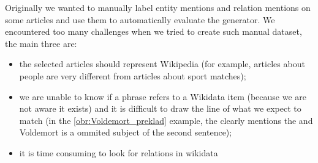 Originally we wanted to manually label entity mentions and relation mentions on some articles and use them to automatically evaluate the generator. We encountered too many challenges when we tried to create such manual dataset, the main three are:
\begin{itemize}
\item the selected articles should represent Wikipedia (for example, articles about people are very different from articles about sport matches);
\item we are unable to know if a phrase refers to a Wikidata item (because we are not aware it exists) and it is difficult to draw the line of what we expect to match (in the \autoref{obr:Voldemort_preklad} example, the  clearly mentions the  and Voldemort is a ommited subject of the second sentence);
\item it is time consuming to look for relations in wikidata


\end{itemize}




